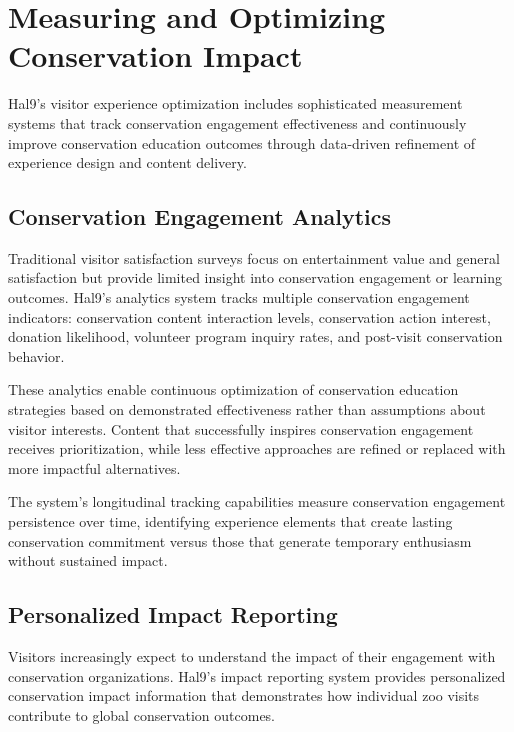 \documentclass[
  Letterpaper,
]{scrbook}
\begin{document}
\section{Measuring and Optimizing Conservation
Impact}\label{measuring-and-optimizing-conservation-impact}

Hal9's visitor experience optimization includes sophisticated
measurement systems that track conservation engagement effectiveness and
continuously improve conservation education outcomes through data-driven
refinement of experience design and content delivery.

\subsection{Conservation Engagement
Analytics}\label{conservation-engagement-analytics}

Traditional visitor satisfaction surveys focus on entertainment value
and general satisfaction but provide limited insight into conservation
engagement or learning outcomes. Hal9's analytics system tracks multiple
conservation engagement indicators: conservation content interaction
levels, conservation action interest, donation likelihood, volunteer
program inquiry rates, and post-visit conservation behavior.

These analytics enable continuous optimization of conservation education
strategies based on demonstrated effectiveness rather than assumptions
about visitor interests. Content that successfully inspires conservation
engagement receives prioritization, while less effective approaches are
refined or replaced with more impactful alternatives.

The system's longitudinal tracking capabilities measure conservation
engagement persistence over time, identifying experience elements that
create lasting conservation commitment versus those that generate
temporary enthusiasm without sustained impact.

\subsection{Personalized Impact
Reporting}\label{personalized-impact-reporting}

Visitors increasingly expect to understand the impact of their
engagement with conservation organizations. Hal9's impact reporting
system provides personalized conservation impact information that
demonstrates how individual zoo visits contribute to global conservation
outcomes.
\end{document}
